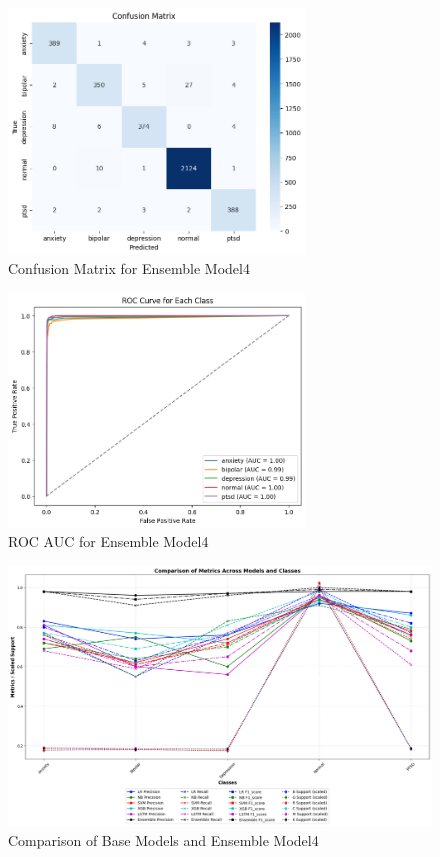 \begin{figure}[h!]  
    \centering
    \includegraphics[width=0.7\textwidth]{Images/BAG CM.png}  
    \caption{Confusion Matrix for Ensemble Model4}
    \label{lstm arch}  %
\end{figure}

\begin{figure}[h!]  
    \centering
    \includegraphics[width=0.7\textwidth]{Images/BAG ROC.png}  
    \caption{ROC AUC for Ensemble Model4}
    \label{lstm arch}  %
\end{figure}

\begin{figure}[h!]  
    \centering
    \includegraphics[width=1.0\textwidth]{Images/BAG RESULT.png}  
    \caption{Comparison of Base Models and Ensemble Model4}
    \label{lstm arch}  %
\end{figure}

